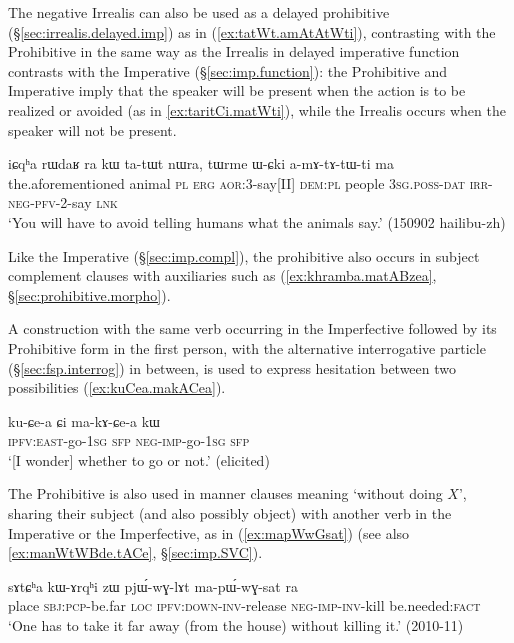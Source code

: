 The negative Irrealis can also be used as a delayed prohibitive (§\ref{sec:irrealis.delayed.imp}) as in (\ref{ex:tatWt.amAtAtWti}), contrasting with the Prohibitive in the same way as the Irrealis in delayed imperative function contrasts with the Imperative (§\ref{sec:imp.function}): the Prohibitive and Imperative imply that the speaker will be present when the action is to be realized or avoided (as in \ref{ex:taritCi.matWti}), while the Irrealis occurs when the speaker will not be present. 

\begin{exe}
\ex  \label{ex:tatWt.amAtAtWti}
\gll iɕqʰa rɯdaʁ ra kɯ ta-tɯt nɯra, tɯrme ɯ-ɕki a-mɤ-tɤ-tɯ-ti ma \\
the.aforementioned animal \textsc{pl} \textsc{erg} \textsc{aor}:3\flobv{}-say[II] \textsc{dem}:\textsc{pl} people \textsc{3sg}.\textsc{poss}-\textsc{dat} \textsc{irr}-\textsc{neg}-\textsc{pfv}-2-say \textsc{lnk} \\
\glt `You will have to avoid telling humans what the animals say.' (150902 hailibu-zh)
\end{exe}

Like the Imperative (§\ref{sec:imp.compl}), the prohibitive also occurs in subject complement clauses with auxiliaries such as  (\ref{ex:khramba.matABzea}, §\ref{sec:prohibitive.morpho}).


A construction with the same verb occurring in the Imperfective followed by its Prohibitive form in the first person, with the alternative interrogative particle  (§\ref{sec:fsp.interrog}) in between, is used to express hesitation between two possibilities (\ref{ex:kuCea.makACea}).

\begin{exe}
\ex  \label{ex:kuCea.makACea}
\gll ku-ɕe-a ɕi ma-kɤ-ɕe-a kɯ \\
\textsc{ipfv}:\textsc{east}-go-\textsc{1sg} \textsc{sfp} \textsc{neg}-\textsc{imp}-go-\textsc{1sg} \textsc{sfp} \\
\glt `[I wonder] whether to go or not.' (elicited)
\end{exe}

The Prohibitive is also used in manner clauses meaning `without doing $X$', sharing their subject (and also possibly object) with another verb in the Imperative or the Imperfective, as in (\ref{ex:mapWwGsat}) (see also \ref{ex:manWtWBde.tACe}, §\ref{sec:imp.SVC}).

\begin{exe}
\ex  \label{ex:mapWwGsat}
\gll  sɤtɕʰa kɯ-ɤrqʰi zɯ pjɯ́-wɣ-lɤt ma-pɯ́-wɣ-sat ra \\
place \textsc{sbj}:\textsc{pcp}-be.far \textsc{loc} \textsc{ipfv}:\textsc{down}-\textsc{inv}-release \textsc{neg}-\textsc{imp}-\textsc{inv}-kill be.needed:\textsc{fact} \\
\glt `One has to take it far away (from the house) without killing it.' (2010-11)
\end{exe}

